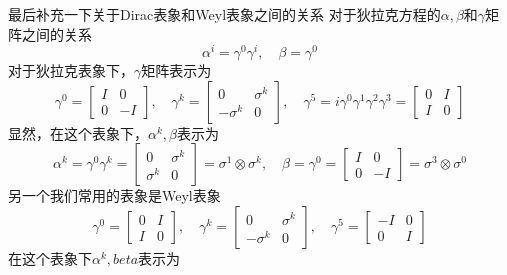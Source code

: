\documentclass{article}
\numberwithin{equation}{subsection}
\begin{document}
    最后补充一下关于Dirac表象和Weyl表象之间的关系
    对于狄拉克方程的$\alpha,\beta$和$\gamma$矩阵之间的关系
    \begin{equation}
        \alpha^i=\gamma^0\gamma^i,\quad \beta=\gamma^0
    \end{equation}
    对于狄拉克表象下，$\gamma$矩阵表示为
    \begin{equation}
        \gamma^0=\begin{bmatrix}
            I&0\\
            0&-I
        \end{bmatrix},\quad\gamma^k=\begin{bmatrix}
            0&\sigma^k\\
            -\sigma^k&0
        \end{bmatrix},\quad\gamma^5=i\gamma^0\gamma^1\gamma^2\gamma^3=\begin{bmatrix}
            0&I\\
            I&0
        \end{bmatrix}
    \end{equation}
    显然，在这个表象下，$\alpha^k,\beta$表示为
    \begin{equation}
        \alpha^k=\gamma^0\gamma^k=\begin{bmatrix}
            0&\sigma^k\\
            \sigma^k&0
        \end{bmatrix}=\sigma^1\otimes\sigma^k,\quad\beta=\gamma^0=\begin{bmatrix}
            I&0\\
            0&-I
        \end{bmatrix}=\sigma^3\otimes\sigma^0
    \end{equation}
    另一个我们常用的表象是Weyl表象
    \begin{equation}
        \gamma^0=\begin{bmatrix}
            0&I\\
            I&0
        \end{bmatrix},\quad\gamma^k=\begin{bmatrix}
            0&\sigma^k\\
            -\sigma^k&0
        \end{bmatrix},\quad\gamma^5=\begin{bmatrix}
            -I&0\\
            0&I
        \end{bmatrix}
    \end{equation}
    在这个表象下$\alpha^k,beta$表示为
\end{document}
